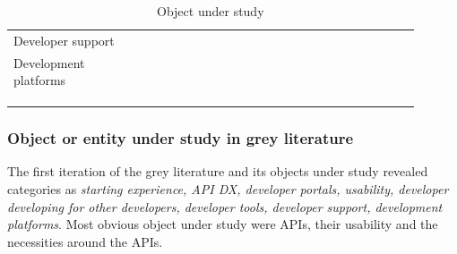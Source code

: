 \documentclass[english, 12pt, a4paper, sci, utf8, a-1b, online]{aaltothesis}
\begin{document}
{\begin{center}
\begin{longtable}{p{0.3\linewidth}p{0.6\linewidth}}
      Developer support                          & \textcite{api-developer-experience-dx-resources} \newline \textcite{contributing-as-a-designer}                                                                                                                                                                                                       \\
      Development platforms                      & \textcite{effective-developer-experience} \newline \textcite{workflows-for-the-new-developer-experience}                                                                                                                                                                                              \\
      \captionsetup{width=0.6\textwidth}                                                                                                                                                                                                                                                                                                                 \\
      \caption{Object under study}                                                                                                                                                                                                                                                                                                                       \\
      \label{table:object-under-study}                                                                                                                                                                                                                                                                                                                   \\
    \end{longtable}
  \end{center}
  \renewcommand{\arraystretch}{1}
}

\subsubsection{Object or entity under study in grey literature}

The first iteration of the grey literature and its objects under study revealed categories as \textit{starting experience, API DX, developer portals, usability, developer developing for other developers, developer tools, developer support, development platforms}. Most obvious object under study were APIs, their usability and the necessities around the APIs.
\end{document}
